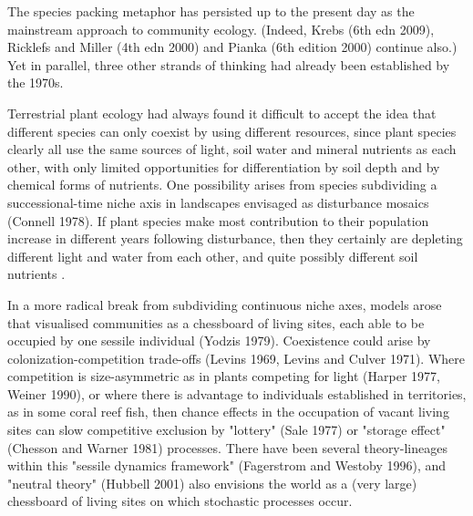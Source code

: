 \documentclass[a4paper,11pt]{article}
\begin{document}

The species packing metaphor has persisted up to the present day as the mainstream approach to community ecology. (Indeed,  Krebs (6th edn 2009), Ricklefs and Miller (4th edn 2000) and Pianka (6th edition 2000) continue also.) Yet in parallel, three other strands of thinking had already been established by the 1970s. 

Terrestrial plant ecology had always found it difficult to accept the idea that different species can only coexist by using different resources, since plant species clearly all use the same sources of light, soil water and mineral nutrients as each other, with only limited opportunities for differentiation by soil depth and by chemical forms of nutrients. One possibility arises from species subdividing a successional-time niche axis in landscapes envisaged as disturbance mosaics (Connell 1978). If plant species make most contribution to their population increase in different years following disturbance, then they certainly are depleting different light and water from each other, and quite possibly different soil nutrients \citep{Huston-1987, Kohyama-1993}. 

In a more radical break from subdividing continuous niche axes, models arose that visualised communities as a chessboard of living sites, each able to be occupied by one sessile individual (Yodzis 1979). Coexistence could arise by colonization-competition trade-offs (Levins 1969, Levins and Culver 1971). Where competition is size-asymmetric as in plants competing for light (Harper 1977, Weiner 1990), or where there is advantage to individuals established in territories, as in some coral reef fish, then chance effects in the occupation of vacant living sites can slow competitive exclusion by "lottery" (Sale 1977) or "storage effect" (Chesson and Warner 1981) processes. There have been several theory-lineages within this "sessile dynamics framework" (Fagerstrom and Westoby 1996), and "neutral theory" (Hubbell 2001) also envisions the world as a (very large) chessboard of living sites on which stochastic processes occur.   
\end{document}
